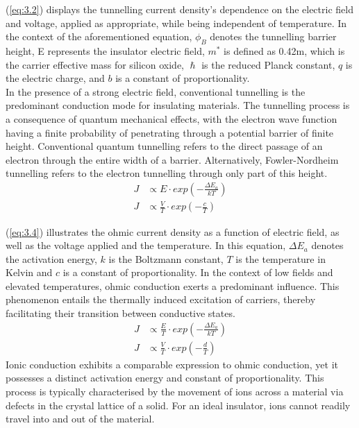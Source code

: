 \noindent (\ref{eq:3.2}) displays the tunnelling current density's dependence on the electric field and voltage, applied as appropriate, while being independent of temperature. In the context of the aforementioned equation, $\phi_B$ denotes the tunnelling barrier height, E represents the insulator electric field, $m^*$ is defined as 0.42m, which is the carrier effective mass for silicon oxide, $\hslash$ is the reduced Planck constant, $q$ is the electric charge, and $b$ is a constant of proportionality.\\

\noindent In the presence of a strong electric field, conventional tunnelling is the predominant conduction mode for insulating materials. The tunnelling process is a consequence of quantum mechanical effects, with the electron wave function having a finite probability of penetrating through a potential barrier of finite height. Conventional quantum tunnelling refers to the direct passage of an electron through the entire width of a barrier. Alternatively, Fowler-Nordheim tunnelling refers to the electron tunnelling through only part of this height.
\begin{align}
    J &\propto E \cdot exp\left( -\frac{\Delta E_a}{kT} \right) \label{eq:3.4} \\
    J &\propto \frac{V}{T} \cdot exp \left( -\frac{c}{T}\right) \label{eq:3.5}
\end{align}

\noindent (\ref{eq:3.4})  illustrates the ohmic current density as a function of electric field, as well as the voltage applied and the temperature. In this equation, $\Delta E_a$ denotes the activation energy, $k$ is the Boltzmann constant, $T$ is the temperature in Kelvin and $c$ is a constant of proportionality. In the context of low fields and elevated temperatures, ohmic conduction exerts a predominant influence. This phenomenon entails the thermally induced excitation of carriers, thereby facilitating their transition between conductive states.
\begin{align}
    J &\propto \frac{E}{T} \cdot exp\left( -\frac{\Delta E_a}{kT} \right) \label{eq:3.6} \\
    J &\propto \frac{V}{T} \cdot exp \left( -\frac{d}{T}\right) \label{eq:3.7}
\end{align}
\noindent Ionic conduction exhibits a comparable expression to ohmic conduction, yet it possesses a distinct activation energy and constant of proportionality. This process is typically characterised by the movement of ions across a material via defects in the crystal lattice of a solid. For an ideal insulator, ions cannot readily travel into and out of the material. \\


